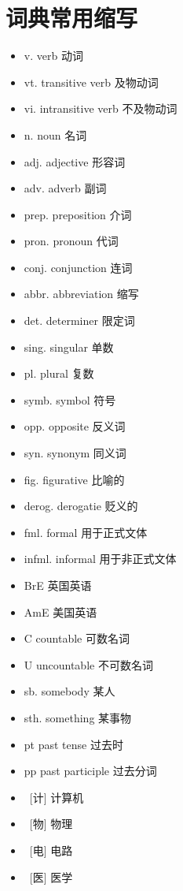 \chapter*{词典常用缩写}
\begin{multicols}{2}
    \begin{itemize}
        \item v. verb 动词
        \item vt. transitive verb 及物动词
        \item vi. intransitive verb 不及物动词
        \item n. noun 名词
        \item adj. adjective 形容词
        \item adv. adverb 副词
        \item prep. preposition 介词
        \item pron. pronoun 代词
        \item conj. conjunction 连词
        \item abbr. abbreviation 缩写
        \item det. determiner 限定词
        \item sing. singular 单数
        \item pl. plural 复数
        \item symb. symbol 符号
        \item opp. opposite 反义词
        \item syn. synonym 同义词
        \item fig. figurative 比喻的
        \item derog. derogatie 贬义的
        \item fml. formal 用于正式文体
        \item infml. informal 用于非正式文体
        \item BrE 英国英语
        \item AmE 美国英语
        \item C countable 可数名词
        \item U uncountable 不可数名词
        \item sb. somebody 某人
        \item sth. something 某事物
        \item pt past tense 过去时
        \item pp past participle 过去分词
        \item \ [计] 计算机
        \item \ [物] 物理
        \item \ [电] 电路
        \item \ [医] 医学
    \end{itemize}
\end{multicols}
